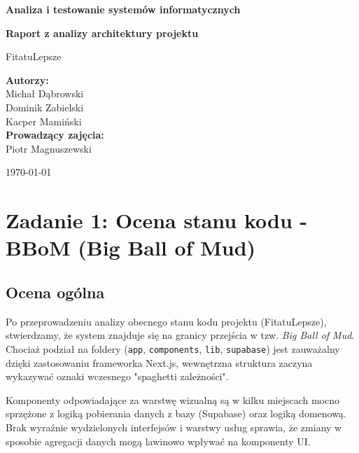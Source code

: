\documentclass[12pt,a4paper]{article}
\begin{document}
\begin{titlepage}
    \centering
    \vspace*{2cm}
    
    {\Huge \bfseries Analiza i testowanie systemów informatycznych \par}
    \vspace{1.5cm}
    {\Large \bfseries Raport z analizy architektury projektu \par}
    \vspace{0.5cm}
    {\large FitatuLepsze \par}
    
    \vspace{3cm}
    
    \begin{flushleft}
    \Large
    \textbf{Autorzy:}\\
    Michał Dąbrowski\\
    Dominik Zabielski\\
    Kacper Mamiński\\[1.5cm]
    
    \textbf{Prowadzący zajęcia:}\\
    Piotr Magnuszewski
    \end{flushleft}
    
    \vfill
    
    {\large \today \par}
\end{titlepage}

\section{Zadanie 1: Ocena stanu kodu - BBoM (Big Ball of Mud)}

\subsection{Ocena ogólna}
Po przeprowadzeniu analizy obecnego stanu kodu projektu (FitatuLepsze), stwierdzamy, że system znajduje się na granicy przejścia w tzw. \textit{Big Ball of Mud}. Chociaż podział na foldery (\texttt{app}, \texttt{components}, \texttt{lib}, \texttt{supabase}) jest zauważalny dzięki zastosowaniu frameworka Next.js, wewnętrzna struktura zaczyna wykazywać oznaki wczesnego "spaghetti zależności".

Komponenty odpowiadające za warstwę wizualną są w kilku miejscach mocno sprzężone z logiką pobierania danych z bazy (Supabase) oraz logiką domenową. Brak wyraźnie wydzielonych interfejsów i warstwy usług sprawia, że zmiany w sposobie agregacji danych mogą lawinowo wpływać na komponenty UI.
\end{document}

